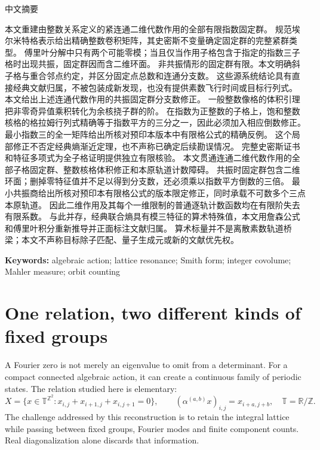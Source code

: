 \documentclass[10pt]{article}
\newcommand{\T}{\mathbb T}
\newcommand{\Z}{\mathbb Z}
\newcommand{\R}{\mathbb R}
\begin{document}
\begin{center}{\cjkfont 中文摘要}\end{center}
{\cjkfont\small\raggedright
\ifcase\CRevisionRound
本文重建由整数关系定义的紧连通二维代数作用的全部有限指数固定群。
规范埃尔米特格表示给出精确整数卷积矩阵，其史密斯不变量确定固定群的完整紧群类型。
傅里叶分解中只有两个可能零模；当且仅当作用子格包含于指定的指数三子格时出现共振，固定群因而含二维环面。
非共振情形的固定群有限。本文明确斜子格与重合邻点约定，并区分固定点总数和连通分支数。
这些源系统结论具有直接经典文献归属，不被包装成新发现，也没有提供素数飞行时间或目标行列式。
\or
本文给出上述连通代数作用的共振固定群分支数修正。
一般整数像格的体积引理把非零奇异值乘积转化为余核挠子群的阶。
在指数为正整数的子格上，饱和整数核格的格拉姆行列式精确等于指数平方的三分之一，因此必须加入相应倒数修正。
最小指数三的全一矩阵给出所核对预印本版本中有限格公式的精确反例。
这个局部修正不否定经典熵渐近定理，也不声称已确定后续勘误情况。
完整史密斯证书和特征多项式为全子格证明提供独立有限核验。
\else
本文贯通连通二维代数作用的全部子格固定群、整数核格体积修正和本原轨道计数障碍。
共振时固定群包含二维环面；删掉零特征值并不足以得到分支数，还必须乘以指数平方倒数的三倍。
最小共振商给出所核对预印本有限格公式的版本限定修正，同时承载不可数多个三点本原轨道。
因此二维作用及其每个一维限制的普通逐轨计数函数均在有限阶失去有限系数。
与此并存，经典联合熵具有模三特征的算术特殊值，本文用詹森公式和傅里叶积分重新推导并正面标注文献归属。
算术标量并不是离散素数轨道桥梁；本文不声称目标除子匹配、量子生成元或新的文献优先权。
\fi\par}
\medskip
\noindent\textbf{Keywords:} algebraic action; lattice resonance; Smith form; integer covolume; Mahler measure; orbit counting
\par{}\par

\section{One relation, two different kinds of fixed groups}
A Fourier zero is not merely an eigenvalue to omit from a determinant.
For a compact connected algebraic action, it can create a continuous family
of periodic states. The relation studied here is elementary:
\begin{equation}\label{eq:source}
 X=\{x\in\T^{\Z^2}:x_{i,j}+x_{i+1,j}+x_{i,j+1}=0\},
 \qquad (\alpha^{(a,b)}x)_{i,j}=x_{i+a,j+b},
 \quad \T=\R/\Z.
\end{equation}
The challenge addressed by this reconstruction is to retain the integral
lattice while passing between fixed groups, Fourier modes and finite
component counts. Real diagonalization alone discards that information.
\end{document}
